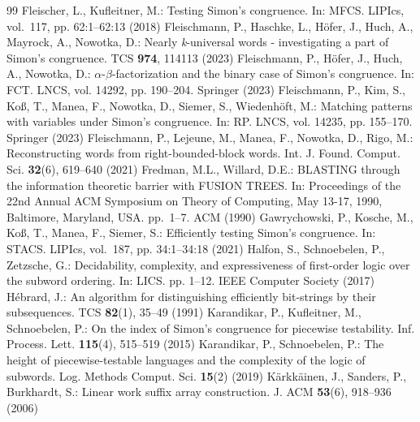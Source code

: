 \documentclass[10pt,a4paper]{amsart}
\theoremstyle{plain}
\theoremstyle{definition}
\begin{document}
\begin{thebibliography}{99}
 Fleischer, L., Kufleitner, M.: Testing {S}imon's congruence. In: {MFCS}. LIPIcs, vol.~117, pp. 62:1--62:13 (2018)
 Fleischmann, P., Haschke, L., H{\"{o}}fer, J., Huch, A., Mayrock, A., Nowotka, D.: Nearly \emph{k}-universal words - investigating a part of {S}imon's congruence. TCS \textbf{974}, 114113 (2023)
 Fleischmann, P., H{\"{o}}fer, J., Huch, A., Nowotka, D.: {\(\alpha\)}-{\(\beta\)}-factorization and the binary case of {S}imon's congruence. In: {FCT}. LNCS, vol. 14292, pp. 190--204. Springer (2023)
 Fleischmann, P., Kim, S., Ko{\ss}, T., Manea, F., Nowotka, D., Siemer, S., Wiedenh{\"{o}}ft, M.: Matching patterns with variables under {S}imon's congruence. In: {RP}. LNCS, vol. 14235, pp. 155--170. Springer (2023)
 Fleischmann, P., Lejeune, M., Manea, F., Nowotka, D., Rigo, M.: Reconstructing words from right-bounded-block words. Int. J. Found. Comput. Sci. \textbf{32}(6), 619--640 (2021)
 Fredman, M.L., Willard, D.E.: {BLASTING} through the information theoretic barrier with {FUSION} {TREES}. In: Proceedings of the 22nd Annual {ACM} Symposium on Theory of Computing, May 13-17, 1990, Baltimore, Maryland, {USA}. pp.~1--7. {ACM} (1990)
 Gawrychowski, P., Kosche, M., Ko{\ss}, T., Manea, F., Siemer, S.: Efficiently testing {S}imon's congruence. In: {STACS}. LIPIcs, vol.~187, pp. 34:1--34:18 (2021)
 Halfon, S., Schnoebelen, P., Zetzsche, G.: Decidability, complexity, and expressiveness of first-order logic over the subword ordering. In: {LICS}. pp. 1--12. {IEEE} Computer Society (2017)
 H{\'{e}}brard, J.: An algorithm for distinguishing efficiently bit-strings by their subsequences. TCS \textbf{82}(1), 35--49 (1991)
 Karandikar, P., Kufleitner, M., Schnoebelen, P.: On the index of {S}imon's congruence for piecewise testability. Inf. Process. Lett. \textbf{115}(4), 515--519 (2015)
 Karandikar, P., Schnoebelen, P.: The height of piecewise-testable languages and the complexity of the logic of subwords. Log. Methods Comput. Sci. \textbf{15}(2) (2019)
 K{\"{a}}rkk{\"{a}}inen, J., Sanders, P., Burkhardt, S.: Linear work suffix array construction. J. {ACM} \textbf{53}(6), 918--936 (2006)

\end{thebibliography}
\end{document}
